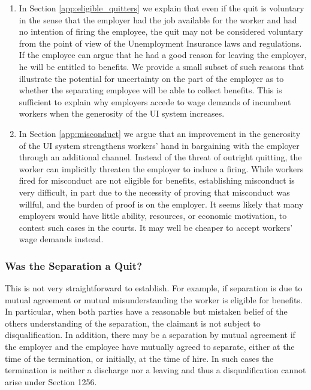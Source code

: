 \documentclass[12pt]{article}
\newcommand{\1}{\mathbf{1}}
\begin{document}
\begin{appendix}
\begin{enumerate}
\item In Section \ref{app:eligible_quitters} we explain that even if the quit is voluntary in the sense that the employer had the job available for the worker and had no intention of firing the employee, the quit may not be considered voluntary from the point of view of the Unemployment Insurance laws and regulations. If the employee can argue that he had a good reason for leaving the employer, he will be entitled to benefits. We provide a small subset of such reasons that illustrate the potential for uncertainty on the part of the employer as to whether the separating employee will be able to collect benefits. This is sufficient to explain why employers accede to wage demands of incumbent workers when the generosity of the UI system increases.

\item In Section \ref{app:misconduct} we argue that an improvement in the generosity of the UI system strengthens workers' hand in bargaining with the employer through an additional channel. Instead of the threat of outright quitting, the worker can implicitly threaten the employer to induce a firing. While workers fired for misconduct are not eligible for benefits, establishing misconduct is very difficult, in part due to the necessity of proving that misconduct was willful, and  the burden of proof is on the employer. It seems likely that many employers would have little ability, resources, or economic motivation, to contest such cases in the courts. It may well be cheaper to accept workers' wage demands instead.

\end{enumerate}


\subsubsection{Was the Separation a Quit?}
\label{app:mutual_misunderstanding}
This is not very straightforward to establish. For example, if separation is due to mutual agreement or mutual misunderstanding the worker is eligible for benefits. In particular, when both parties have a reasonable but mistaken belief of the others understanding of the separation, the claimant is not subject to disqualification. In addition, there may be a separation by mutual agreement if the employer and the employee have mutually agreed to separate, either at the time of the termination, or initially, at the time of hire. In such cases the termination is neither a discharge nor a leaving and thus a disqualification cannot arise under Section 1256.


\end{appendix}
\end{document}
